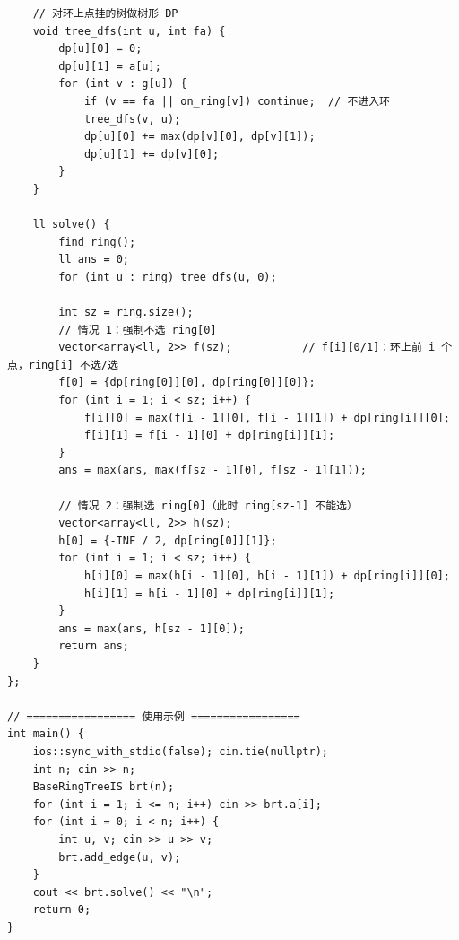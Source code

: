 \begin{lstlisting}
    // 对环上点挂的树做树形 DP
    void tree_dfs(int u, int fa) {
        dp[u][0] = 0;
        dp[u][1] = a[u];
        for (int v : g[u]) {
            if (v == fa || on_ring[v]) continue;  // 不进入环
            tree_dfs(v, u);
            dp[u][0] += max(dp[v][0], dp[v][1]);
            dp[u][1] += dp[v][0];
        }
    }

    ll solve() {
        find_ring();
        ll ans = 0;
        for (int u : ring) tree_dfs(u, 0);

        int sz = ring.size();
        // 情况 1：强制不选 ring[0]
        vector<array<ll, 2>> f(sz);           // f[i][0/1]：环上前 i 个点，ring[i] 不选/选
        f[0] = {dp[ring[0]][0], dp[ring[0]][0]};
        for (int i = 1; i < sz; i++) {
            f[i][0] = max(f[i - 1][0], f[i - 1][1]) + dp[ring[i]][0];
            f[i][1] = f[i - 1][0] + dp[ring[i]][1];
        }
        ans = max(ans, max(f[sz - 1][0], f[sz - 1][1]));

        // 情况 2：强制选 ring[0]（此时 ring[sz-1] 不能选）
        vector<array<ll, 2>> h(sz);
        h[0] = {-INF / 2, dp[ring[0]][1]};
        for (int i = 1; i < sz; i++) {
            h[i][0] = max(h[i - 1][0], h[i - 1][1]) + dp[ring[i]][0];
            h[i][1] = h[i - 1][0] + dp[ring[i]][1];
        }
        ans = max(ans, h[sz - 1][0]);
        return ans;
    }
};

// ================= 使用示例 =================
int main() {
    ios::sync_with_stdio(false); cin.tie(nullptr);
    int n; cin >> n;
    BaseRingTreeIS brt(n);
    for (int i = 1; i <= n; i++) cin >> brt.a[i];
    for (int i = 0; i < n; i++) {
        int u, v; cin >> u >> v;
        brt.add_edge(u, v);
    }
    cout << brt.solve() << "\n";
    return 0;
}
\end{lstlisting}
